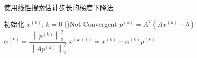 \begin{algorithm}[htbp]
    \caption{使用线性搜索估计步长的梯度下降法}
    初始化 $ x^{(0)} $, $k=0$\;
    \While(){Not Convergent}{
        $p^{(k)}=A^{T}\left(A x^{(k)}-b\right)$\;
        $\alpha^{(k)}=\dfrac{\left\|p^{(k)}\right\|_{2}^{2}}{\left\|A p^{(k)}\right\|_{2}^{2}}$\;
        $x^{(k+1)}=x^{(k)}-\alpha^{(k)} p^{(k)}$\;
    }
\end{algorithm}